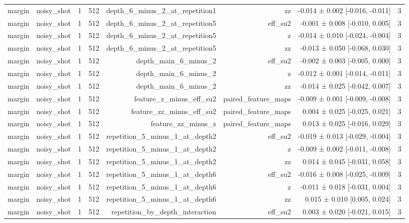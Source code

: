 \begin{table}
\begin{tabular}{lrrrrrrr}
margin & noisy\_shot & 1 & 512 & depth\_6\_minus\_2\_at\_repetition1 & zz & -0.014 ± 0.002 [-0.016, -0.011] & 3 \\
margin & noisy\_shot & 1 & 512 & depth\_6\_minus\_2\_at\_repetition5 & eff\_su2 & -0.001 ± 0.008 [-0.010, 0.005] & 3 \\
margin & noisy\_shot & 1 & 512 & depth\_6\_minus\_2\_at\_repetition5 & z & -0.014 ± 0.010 [-0.024, -0.004] & 3 \\
margin & noisy\_shot & 1 & 512 & depth\_6\_minus\_2\_at\_repetition5 & zz & -0.013 ± 0.050 [-0.068, 0.030] & 3 \\
margin & noisy\_shot & 1 & 512 & depth\_main\_6\_minus\_2 & eff\_su2 & -0.002 ± 0.003 [-0.005, 0.000] & 3 \\
margin & noisy\_shot & 1 & 512 & depth\_main\_6\_minus\_2 & z & -0.012 ± 0.001 [-0.014, -0.011] & 3 \\
margin & noisy\_shot & 1 & 512 & depth\_main\_6\_minus\_2 & zz & -0.014 ± 0.025 [-0.042, 0.007] & 3 \\
margin & noisy\_shot & 1 & 512 & feature\_z\_minus\_eff\_su2 & paired\_feature\_maps & -0.009 ± 0.001 [-0.009, -0.008] & 3 \\
margin & noisy\_shot & 1 & 512 & feature\_zz\_minus\_eff\_su2 & paired\_feature\_maps & 0.004 ± 0.025 [-0.025, 0.021] & 3 \\
margin & noisy\_shot & 1 & 512 & feature\_zz\_minus\_z & paired\_feature\_maps & 0.013 ± 0.025 [-0.016, 0.029] & 3 \\
margin & noisy\_shot & 1 & 512 & repetition\_5\_minus\_1\_at\_depth2 & eff\_su2 & -0.019 ± 0.013 [-0.029, -0.004] & 3 \\
margin & noisy\_shot & 1 & 512 & repetition\_5\_minus\_1\_at\_depth2 & z & -0.009 ± 0.002 [-0.011, -0.008] & 3 \\
margin & noisy\_shot & 1 & 512 & repetition\_5\_minus\_1\_at\_depth2 & zz & 0.014 ± 0.045 [-0.031, 0.058] & 3 \\
margin & noisy\_shot & 1 & 512 & repetition\_5\_minus\_1\_at\_depth6 & eff\_su2 & -0.016 ± 0.008 [-0.025, -0.009] & 3 \\
margin & noisy\_shot & 1 & 512 & repetition\_5\_minus\_1\_at\_depth6 & z & -0.011 ± 0.018 [-0.031, 0.004] & 3 \\
margin & noisy\_shot & 1 & 512 & repetition\_5\_minus\_1\_at\_depth6 & zz & 0.015 ± 0.010 [0.005, 0.024] & 3 \\
margin & noisy\_shot & 1 & 512 & repetition\_by\_depth\_interaction & eff\_su2 & 0.003 ± 0.020 [-0.021, 0.015] & 3 \\

\end{tabular}
\end{table}
